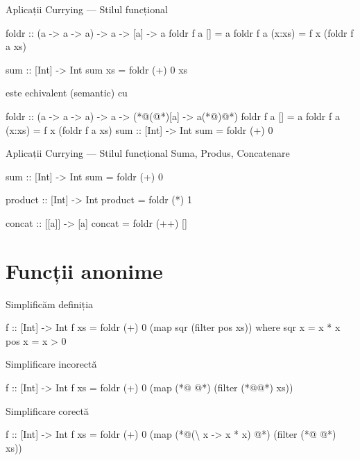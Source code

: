 \documentclass[handout,xcolor=pdftex,romanian,colorlinks]{beamer}
\begin{document}
\begin{frame}[fragile]{Aplicații Currying --- Stilul funcțional}
\begin{asciihs}
foldr :: (a -> a -> a) -> a -> [a] -> a
foldr f a []     = a
foldr f a (x:xs) = f x (foldr f a xs)

sum :: [Int] -> Int
sum xs = foldr (+) 0 xs
\end{asciihs}
este echivalent (semantic) cu 
\begin{asciihs}
foldr :: (a -> a -> a) -> a -> (*@\color{blue}(@*)[a] -> a(*@\color{blue})@*)
foldr f a []     = a
foldr f a (x:xs) = f x (foldr f a xs)
sum :: [Int] -> Int
sum = foldr (+) 0
\end{asciihs}
\end{frame}


\begin{frame}[fragile]{Aplicații Currying --- Stilul funcțional}
{Suma, Produs, Concatenare}
\begin{asciihs}
sum :: [Int] -> Int
sum = foldr (+) 0

product :: [Int] -> Int
product = foldr (*) 1

concat :: [[a]] -> [a]
concat = foldr (++) []
\end{asciihs}
\end{frame}

\section{Funcții anonime}

\begin{frame}[fragile]{Simplificăm definiția}
\begin{asciihs}
f :: [Int] -> Int
f xs = foldr (+) 0 (map sqr (filter pos xs))
  where
    sqr x = x * x
    pos x = x > 0
\end{asciihs}
\begin{alertblock}{Simplificare incorectă}
\begin{asciihs}
f :: [Int] -> Int
f xs = foldr (+) 0 (map (*@\color{red}{(x * x)} @*) (filter (*@\color{red}{(x > 0)}@*) xs))
\end{asciihs}
\end{alertblock}
\begin{block}{Simplificare corectă}
\begin{asciihs}
f :: [Int] -> Int
f xs = foldr (+) 0 
         (map (*@\color{blue}(\textbackslash\; x -> x * x) @*) 
            (filter (*@\color{blue}{(\textbackslash\; x -> x > 0)} @*) xs))
\end{asciihs}
\end{block}
\end{frame}
\end{document}

